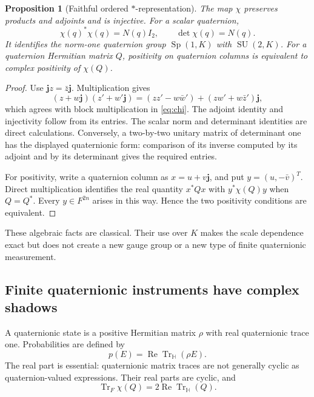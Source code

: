 \documentclass[11pt,oneside]{article}
\numberwithin{equation}{section}
\theoremstyle{plain}
\newtheorem{proposition}[theorem]{Proposition}
\theoremstyle{definition}
\theoremstyle{remark}
\newcommand{\HH}{\mathbb H}
\newcommand{\Tr}{\operatorname{Tr}}
\newcommand{\Rea}{\operatorname{Re}}
\newcommand{\SU}{\operatorname{SU}}
\newcommand{\Sp}{\operatorname{Sp}}
\begin{document}
\begin{proposition}[Faithful ordered $*$-representation]\label{prop:chi}
The map $\chi$ preserves products and adjoints and is injective. For a scalar quaternion,
\[
 \chi(q)^*\chi(q)=N(q)I_2,\qquad
 \det\chi(q)=N(q).
\]
It identifies the norm-one quaternion group $\Sp(1,K)$ with $\SU(2,K)$. For a quaternion Hermitian matrix $Q$, positivity on quaternion columns is equivalent to complex positivity of $\chi(Q)$.
\end{proposition}
\begin{proof}
Use $\mathbf j z=\bar z\mathbf j$. Multiplication gives
\[
 (z+w\mathbf j)(z'+w'\mathbf j)
 =(zz'-w\bar w')+(zw'+w\bar z')\mathbf j,
\]
which agrees with block multiplication in \eqref{eq:chi}. The adjoint identity and injectivity follow from its entries. The scalar norm and determinant identities are direct calculations. Conversely, a two-by-two unitary matrix of determinant one has the displayed quaternionic form: comparison of its inverse computed by its adjoint and by its determinant gives the required entries.

For positivity, write a quaternion column as $x=u+v\mathbf j$, and put $y=(u,-\bar v)^T$. Direct multiplication identifies the real quantity $x^*Qx$ with $y^*\chi(Q)y$ when $Q=Q^*$. Every $y\in F^{2n}$ arises in this way. Hence the two positivity conditions are equivalent.
\end{proof}

These algebraic facts are classical. Their use over $K$ makes the scale dependence exact but does not create a new gauge group or a new type of finite quaternionic measurement.

\subsection{Finite quaternionic instruments have complex shadows}
A quaternionic state is a positive Hermitian matrix $\rho$ with real quaternionic trace one. Probabilities are defined by
\begin{equation}\label{eq:quatborn}
 p(E)=\Rea\Tr_{\HH}(\rho E).
\end{equation}
The real part is essential: quaternionic matrix traces are not generally cyclic as quaternion-valued expressions. Their real parts are cyclic, and
\begin{equation}\label{eq:quattrace}
 \Tr_F\chi(Q)=2\Rea\Tr_{\HH}(Q).
\end{equation}
\end{document}
